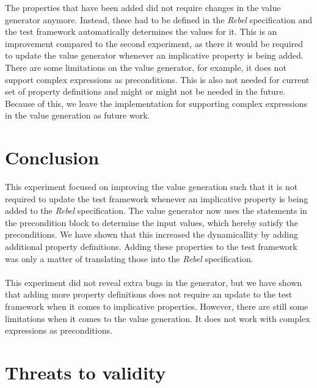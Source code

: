 The properties that have been added did not require changes in the value generator anymore. Instead, these had to be defined in the \textit{Rebel} specification and the test framework automatically determines the values for it. This is an improvement compared to the second experiment, as there it would be required to update the value generator whenever an implicative property is being added. There are some limitations on the value generator, for example, it does not support complex expressions as preconditions. This is also not needed for current set of property definitions and might or might not be needed in the future. Because of this, we leave the implementation for supporting complex expressions in the value generation as future work.

\section{Conclusion}
This experiment focused on improving the value generation such that it is not required to update the test framework whenever an implicative property is being added to the \textit{Rebel} specification. The value generator now uses the statements in the precondition block to determine the input values, which hereby satisfy the preconditions. We have shown that this increased the dynamicallity by adding additional property definitions. Adding these properties to the test framework was only a matter of translating those into the \textit{Rebel} specification.\\
\\
This experiment did not reveal extra bugs in the generator, but we have shown that adding more property definitions does not require an update to the test framework when it comes to implicative properties. However, there are still some limitations when it comes to the value generation. It does not work with complex expressions as preconditions.

\section{Threats to validity}

